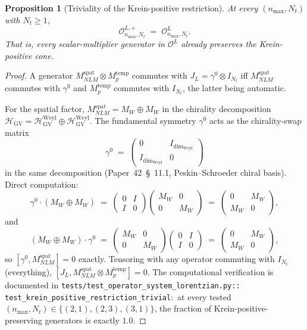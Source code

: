 \documentclass[11pt,a4paper]{article}
\theoremstyle{plain}
\newtheorem{proposition}[theorem]{Proposition}
\theoremstyle{definition}
\newcommand{\nmax}{n_{\max}}
\newcommand{\Nt}{N_t}
\newcommand{\Op}{\mathcal{O}}
\newcommand{\JL}{J_L}
\newcommand{\HGV}{\mathcal{H}_{\mathrm{GV}}}
\newcommand{\spat}{\mathrm{spat}}
\newcommand{\temp}{\mathrm{temp}}
\newcommand{\Weyl}{\mathrm{Weyl}}
\begin{document}
\begin{proposition}[Triviality of the Krein-positive restriction]
\label{prop:krein_positivity_trivial}
At every $(\nmax, \Nt)$ with $\Nt \ge 1$,
\begin{equation}\label{eq:O_L_plus_trivial}
   \Op^{L, +}_{\nmax, \Nt} \;=\; \Op_{\nmax, \Nt}^L.
\end{equation}
That is, every scalar-multiplier generator in $\Op^L$ already
preserves the Krein-positive cone.
\end{proposition}

\begin{proof}
A generator $M^{\spat}_{NLM} \otimes M_p^{\temp}$ commutes with
$\JL = \gamma^0 \otimes I_{\Nt}$ iff
$M^{\spat}_{NLM}$ commutes with $\gamma^0$ and
$M_p^{\temp}$ commutes with $I_{\Nt}$, the latter being automatic.

For the spatial factor, $M^{\spat}_{NLM} = M_W \oplus M_W$ in the
chirality decomposition $\HGV = \HGV^{\Weyl} \oplus \HGV^{\Weyl}$.
The fundamental symmetry $\gamma^0$ acts as the chirality-swap
matrix
\[
   \gamma^0
   \;=\; \begin{pmatrix} 0 & I_{\dim_\Weyl} \\
                          I_{\dim_\Weyl} & 0 \end{pmatrix}
\]
in the same decomposition (Paper~42~\S~11.1, Peskin--Schroeder chiral
basis). Direct computation:
\[
   \gamma^0 \cdot (M_W \oplus M_W)
   \;=\; \begin{pmatrix} 0 & I \\ I & 0 \end{pmatrix}
         \begin{pmatrix} M_W & 0 \\ 0 & M_W \end{pmatrix}
   \;=\; \begin{pmatrix} 0 & M_W \\ M_W & 0 \end{pmatrix},
\]
and
\[
   (M_W \oplus M_W) \cdot \gamma^0
   \;=\; \begin{pmatrix} M_W & 0 \\ 0 & M_W \end{pmatrix}
         \begin{pmatrix} 0 & I \\ I & 0 \end{pmatrix}
   \;=\; \begin{pmatrix} 0 & M_W \\ M_W & 0 \end{pmatrix},
\]
so $[\gamma^0, M^{\spat}_{NLM}] = 0$ exactly. Tensoring with any
operator commuting with $I_{\Nt}$ (everything),
$[\JL, M^{\spat}_{NLM} \otimes M_p^{\temp}] = 0$. The
computational verification is documented in
\texttt{tests/test\_operator\_system\_lorentzian.py::%
test\_krein\_positive\_restriction\_trivial}:\ at every tested
$(\nmax, \Nt) \in \{(2, 1), (2, 3), (3, 1)\}$, the fraction of
Krein-positive-preserving generators is exactly $1.0$.
\end{proof}
\end{document}
